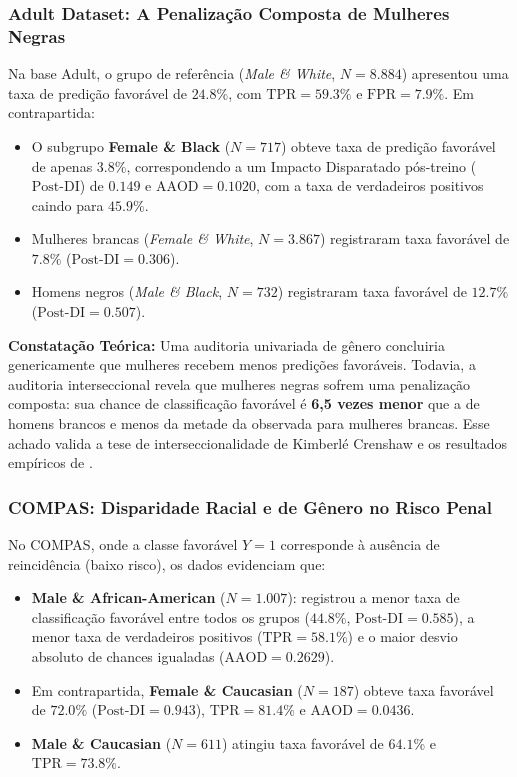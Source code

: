 \subsubsection{Adult Dataset: A Penalização Composta de Mulheres Negras}
Na base Adult, o grupo de referência (\textit{Male \& White}, $N=8.884$) apresentou uma taxa de predição favorável de $24.8\%$, com $\text{TPR} = 59.3\%$ e $\text{FPR} = 7.9\%$. Em contrapartida:
\begin{itemize}
    \item O subgrupo \textbf{Female \& Black} ($N=717$) obteve taxa de predição favorável de apenas \textbf{$3.8\%$}, correspondendo a um Impacto Disparatado pós-treino ($\text{Post-DI}$) de \textbf{$0.149$} e $\text{AAOD} = 0.1020$, com a taxa de verdadeiros positivos caindo para $45.9\%$.
    \item Mulheres brancas (\textit{Female \& White}, $N=3.867$) registraram taxa favorável de $7.8\%$ ($\text{Post-DI} = 0.306$).
    \item Homens negros (\textit{Male \& Black}, $N=732$) registraram taxa favorável de $12.7\%$ ($\text{Post-DI} = 0.507$).
\end{itemize}

\noindent\textbf{Constatação Teórica:} Uma auditoria univariada de gênero concluiria genericamente que mulheres recebem menos predições favoráveis. Todavia, a auditoria interseccional revela que mulheres negras sofrem uma penalização composta: sua chance de classificação favorável é \textbf{6,5 vezes menor} que a de homens brancos e menos da metade da observada para mulheres brancas. Esse achado valida a tese de interseccionalidade de Kimberl\'e Crenshaw e os resultados empíricos de \cite{buolamwini2018gender}.

\subsubsection{COMPAS: Disparidade Racial e de Gênero no Risco Penal}
No COMPAS, onde a classe favorável $Y=1$ corresponde à ausência de reincidência (baixo risco), os dados evidenciam que:
\begin{itemize}
    \item \textbf{Male \& African-American} ($N=1.007$): registrou a menor taxa de classificação favorável entre todos os grupos ($44.8\%$, $\text{Post-DI} = 0.585$), a menor taxa de verdadeiros positivos ($\text{TPR} = 58.1\%$) e o maior desvio absoluto de chances igualadas ($\text{AAOD} = 0.2629$).
    \item Em contrapartida, \textbf{Female \& Caucasian} ($N=187$) obteve taxa favorável de $72.0\%$ ($\text{Post-DI} = 0.943$), $\text{TPR} = 81.4\%$ e $\text{AAOD} = 0.0436$.
    \item \textbf{Male \& Caucasian} ($N=611$) atingiu taxa favorável de $64.1\%$ e $\text{TPR} = 73.8\%$.
\end{itemize}

